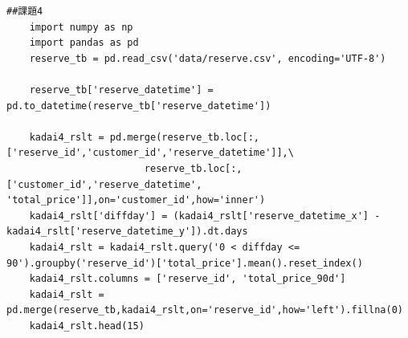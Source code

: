 \documentclass[12pt]{jarticle}
\begin{document}
\begin{lstlisting}[style = py,caption=課題4]
    ##課題4
    import numpy as np
    import pandas as pd
    reserve_tb = pd.read_csv('data/reserve.csv', encoding='UTF-8')
    
    reserve_tb['reserve_datetime'] = pd.to_datetime(reserve_tb['reserve_datetime'])
    
    kadai4_rslt = pd.merge(reserve_tb.loc[:, ['reserve_id','customer_id','reserve_datetime']],\
                        reserve_tb.loc[:, ['customer_id','reserve_datetime', 'total_price']],on='customer_id',how='inner')
    kadai4_rslt['diffday'] = (kadai4_rslt['reserve_datetime_x'] - kadai4_rslt['reserve_datetime_y']).dt.days
    kadai4_rslt = kadai4_rslt.query('0 < diffday <= 90').groupby('reserve_id')['total_price'].mean().reset_index()
    kadai4_rslt.columns = ['reserve_id', 'total_price_90d']
    kadai4_rslt = pd.merge(reserve_tb,kadai4_rslt,on='reserve_id',how='left').fillna(0)
    kadai4_rslt.head(15)
\end{lstlisting}
\end{document}

